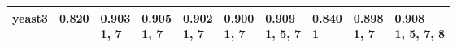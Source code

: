 \begin{tabular}{llllllllll}
yeast3                 &                     \makecell{0.820 \\ \scriptsize{}} &        \makecell{0.903 \\ \scriptsize{1, 7}} &  \makecell{0.905 \\ \scriptsize{1, 7}} &  \makecell{0.902 \\ \scriptsize{1, 7}} &     \makecell{0.900 \\ \scriptsize{1, 7}} &  \makecell{0.909 \\ \scriptsize{1, 5, 7}} &                    \makecell{0.840 \\ \scriptsize{1}} &                 \makecell{0.898 \\ \scriptsize{1, 7}} &  \makecell{0.908 \\ \scriptsize{1, 5, 7, 8}} \\
\bottomrule
\end{tabular}
